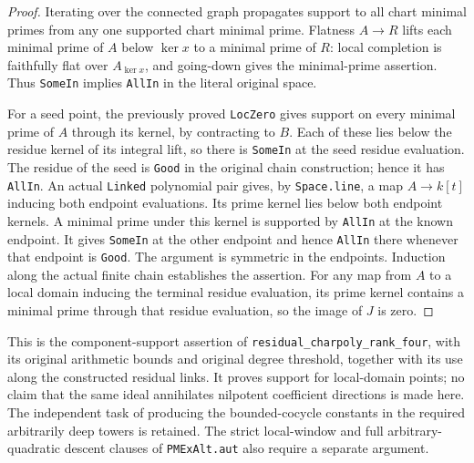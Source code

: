 \begin{proof}
Iterating over the connected graph propagates
support to all chart minimal primes from any
one supported chart minimal prime. Flatness
$A\to R$ lifts each minimal prime of $A$ below
$\ker x$ to a minimal prime of $R$: local
completion is faithfully flat over $A_{\ker x}$,
and going-down gives the minimal-prime
assertion. Thus \texttt{SomeIn} implies
\texttt{AllIn} in the literal original space.

For a seed point, the previously proved
\texttt{LocZero} gives support on every minimal
prime of $A$ through its kernel, by contracting
to $B$. Each of these lies below the residue
kernel of its integral lift, so there is
\texttt{SomeIn} at the seed residue evaluation.
The residue of the seed is \texttt{Good} in the
original chain construction; hence it has
\texttt{AllIn}. An actual \texttt{Linked}
polynomial pair gives, by \texttt{Space.line},
a map $A\to k[t]$ inducing both endpoint
evaluations. Its prime kernel lies below
both endpoint kernels. A minimal prime
under this kernel is supported by
\texttt{AllIn} at the known endpoint. It
gives \texttt{SomeIn} at the other endpoint
and hence \texttt{AllIn} there whenever
that endpoint is \texttt{Good}. The
argument is symmetric in the endpoints.
Induction along the actual finite chain
establishes the assertion. For any map
from $A$ to a local domain inducing the
terminal residue evaluation, its prime
kernel contains a minimal prime through
that residue evaluation, so the image of
$J$ is zero.
\end{proof}

This is the component-support assertion of
\texttt{residual\_charpoly\_rank\_four}, with its original
arithmetic bounds and original degree threshold, together
with its use along the constructed residual links.
It proves support for local-domain points; no claim that
the same ideal annihilates nilpotent coefficient directions
is made here. The independent task of producing the
bounded-cocycle constants in the required arbitrarily deep
towers is retained. The strict local-window and full
arbitrary-quadratic descent clauses of \texttt{PMExAlt.aut}
also require a separate argument.
